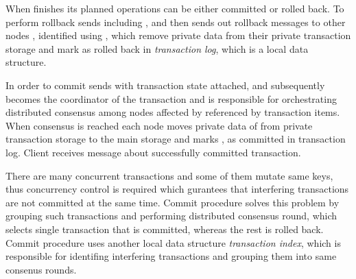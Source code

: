 When \client finishes its planned operations \transaction can be either committed or rolled back. To perform rollback \client sends \txRollbackMessage including \txState, and then  sends out rollback messages to other nodes \rollbackMessage, identified using \txItems, which remove private data from their private transaction storage and mark \transaction as rolled back in \emph{transaction log}, which is a local data structure.

In order to commit \transaction \client sends \txCommitMessage with transaction state attached, and subsequently  becomes the coordinator of the transaction and is responsible for orchestrating distributed consensus among nodes affected by \transaction referenced by transaction items. When consensus is reached each node moves private data of \transaction from private transaction storage to the main storage and marks \transaction, as committed in transaction log. Client receives message \txCommitResonseMessage about successfully committed transaction.

There are many concurrent transactions and some of them mutate same keys, thus concurrency control is required which gurantees that interfering transactions are not committed at the same time. Commit procedure solves this problem by grouping such transactions and performing distributed consensus round, which selects single transaction that is committed, whereas the rest is rolled back.
Commit procedure uses another local data structure \emph{transaction index}, which is responsible for identifing interfering transactions and grouping them into same consenus rounds.

